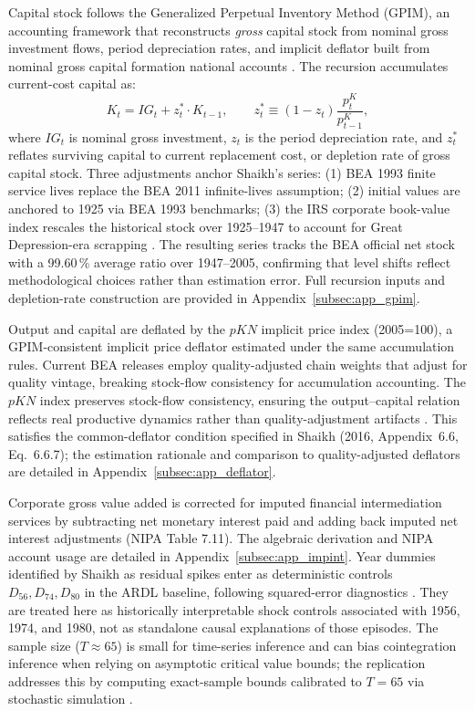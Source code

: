 \documentclass[11pt]{article}
\begin{document}
Capital stock follows the Generalized Perpetual Inventory Method (GPIM), an accounting framework that reconstructs \textit{gross} capital stock from nominal gross investment flows, period depreciation rates, and implicit deflator built from nominal gross capital formation national accounts  \citep{Shaikh2016}. The recursion accumulates current-cost capital as:
\begin{equation}
K_t = IG_t + z_t^* \cdot K_{t-1},
\qquad
z_t^* \equiv (1 - z_t) \frac{p^K_t}{p^K_{t-1}},
\end{equation}
where $IG_t$ is nominal gross investment, $z_t$ is the period depreciation rate, and $z_t^*$ reflates surviving capital to current replacement cost, or depletion rate of gross capital stock. Three adjustments anchor Shaikh's series: (1) BEA 1993 finite service lives replace the BEA 2011 infinite-lives assumption; (2) initial values are anchored to 1925 via BEA 1993 benchmarks; (3) the IRS corporate book-value index rescales the historical stock over 1925--1947 to account for Great Depression-era scrapping \citep[Appendix~6.7, Sec.~V]{Shaikh2016}. The resulting series tracks the BEA official net stock with a 99.60\,\% average ratio over 1947--2005, confirming that level shifts reflect methodological choices rather than estimation error. Full recursion inputs and depletion-rate construction are provided in Appendix~\ref{subsec:app_gpim}.

Output and capital are deflated by the $pKN$ implicit price index (2005=100), a GPIM-consistent implicit price deflator estimated under the same accumulation rules. Current BEA releases employ quality-adjusted chain weights that adjust for quality vintage, breaking stock-flow consistency for accumulation accounting. The $pKN$ index preserves stock-flow consistency, ensuring the output--capital relation reflects real productive dynamics rather than quality-adjustment artifacts \citep[Appendix~6.6, Sec.~II]{Shaikh2016}. This satisfies the common-deflator condition specified in Shaikh (2016, Appendix~6.6, Eq.~6.6.7); the estimation rationale and comparison to quality-adjusted deflators are detailed in Appendix~\ref{subsec:app_deflator}.

Corporate gross value added is corrected for imputed financial intermediation services by subtracting net monetary interest paid and adding back imputed net interest adjustments (NIPA Table 7.11). The algebraic derivation and NIPA account usage are detailed in Appendix~\ref{subsec:app_impint}. Year dummies identified by Shaikh as residual spikes enter as deterministic controls $D_{56}, D_{74}, D_{80}$ in the ARDL baseline, following squared-error diagnostics \citep{Patterson2000}. They are treated here as historically interpretable shock controls associated with 1956, 1974, and 1980, not as standalone causal explanations of those episodes. The sample size ($T \approx 65$) is small for time-series inference and can bias cointegration inference when relying on asymptotic critical value bounds; the replication addresses this by computing exact-sample bounds calibrated to $T=65$ via stochastic simulation \citep{NatsiopoulosTzeremes2022}.
\end{document}
